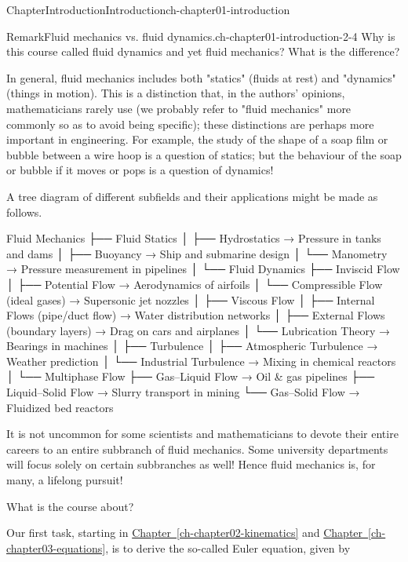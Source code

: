 \documentclass[oneside,10pt,]{book}
\newcommand{\xreffont}{\relax}
\numberwithin{equation}{section}
\begin{document}
\begin{chapterptx}{Chapter}{Introduction}{}{Introduction}{}{}{ch-chapter01-introduction}
\begin{introduction}{}
\begin{remark}{Remark}{Fluid mechanics vs. fluid dynamics.}{ch-chapter01-introduction-2-4}
Why is this course called fluid dynamics and yet fluid mechanics? What is the difference?%
\par
In general, fluid mechanics includes both "statics" (fluids at rest) and "dynamics" (things in motion). This is a distinction that, in the authors' opinions, mathematicians rarely use (we probably refer to "fluid mechanics" more commonly so as to avoid being specific); these distinctions are perhaps more important in engineering. For example, the study of the shape of a soap film or bubble between a wire hoop is a question of statics; but the behaviour of the soap or bubble if it moves or pops is a question of dynamics!%
\par
A tree diagram of different subfields and their applications might be made as follows.%
\begin{preformatted}
Fluid Mechanics
 ├── Fluid Statics
 │     ├── Hydrostatics → Pressure in tanks and dams
 │     ├── Buoyancy → Ship and submarine design
 │     └── Manometry → Pressure measurement in pipelines
 │
 └── Fluid Dynamics
       ├── Inviscid Flow
       │     ├── Potential Flow → Aerodynamics of airfoils
       │     └── Compressible Flow (ideal gases) → Supersonic jet nozzles
       │
       ├── Viscous Flow
       │     ├── Internal Flows (pipe/duct flow) → Water distribution networks
       │     ├── External Flows (boundary layers) → Drag on cars and airplanes
       │     └── Lubrication Theory → Bearings in machines
       │
       ├── Turbulence
       │     ├── Atmospheric Turbulence → Weather prediction
       │     └── Industrial Turbulence → Mixing in chemical reactors
       │
       └── Multiphase Flow
             ├── Gas–Liquid Flow → Oil & gas pipelines
             ├── Liquid–Solid Flow → Slurry transport in mining
             └── Gas–Solid Flow → Fluidized bed reactors
\end{preformatted}
It is not uncommon for some scientists and mathematicians to devote their entire careers to an entire subbranch of fluid mechanics. Some university departments will focus solely on certain subbranches as well! Hence fluid mechanics is, for many, a lifelong pursuit!%
\end{remark}
What is the course about?%
\par
Our first task, starting in \hyperref[ch-chapter02-kinematics]{Chapter~{\xreffont\ref{ch-chapter02-kinematics}}} and \hyperref[ch-chapter03-equations]{Chapter~{\xreffont\ref{ch-chapter03-equations}}}, is to derive the so-called Euler equation, given by%
\begin{equation*}

\end{equation*}
\end{introduction}
\end{chapterptx}
\end{document}
